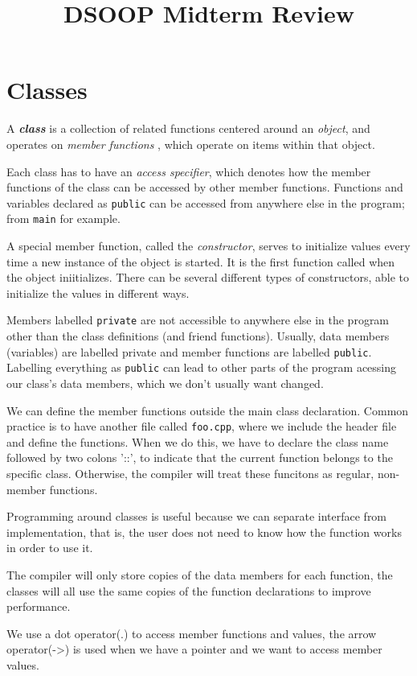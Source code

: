\documentclass{article}
\title{DSOOP Midterm Review}
\begin{document}
\maketitle
\section{Classes}
A \textbf{\textit{class}} is a collection of related functions centered around an \textit{object}, and operates
on \textit{member functions} , which operate on items within that object.

Each class has to have an \textit{access specifier}, which denotes how the member functions of the class can 
be accessed by other member functions. Functions and variables declared as \texttt{public} can be accessed 
from anywhere else in the program; from \texttt{main} for example. 

A special member function, called the \textit{constructor}, serves to initialize values every time a new 
instance of the object is started. It is the first function called when the object iniitializes. There 
can be several different types of constructors, able to initialize the values in different ways.

Members labelled \texttt{private} are not accessible to anywhere else in the program other than the 
class definitions (and friend functions).  Usually, data members (variables) are labelled private 
and member functions are labelled \texttt{public}. Labelling everything as \texttt{public} can lead
to other parts of the program acessing our class's data members, which we don't usually want changed.

We can define the member functions outside the main class declaration. Common practice is to have another
file called \texttt{foo.cpp}, where we include the header file and define the functions. When we do this, 
we have to declare the class name followed by two colons '::', to indicate that the current function belongs
to the specific class. Otherwise, the compiler will treat these funcitons as regular, non-member functions.

Programming around classes is useful because we can separate interface from implementation, that is, the user
does not need to know how the function works in order to use it. 

The compiler will only store copies of the data members for each function, the classes will all use the same 
copies of the function declarations to improve performance.

We use a dot operator(.) to access member functions and values, the arrow operator(->) is used when we have a
pointer and we want to access member values.
\end{document}
